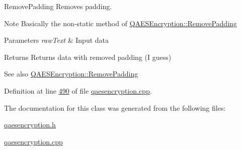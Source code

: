 Remove\+Padding Removes padding. 

\begin{DoxyNote}{Note}
Basically the non-\/static method of \hyperlink{class_q_a_e_s_encryption_abb2887bf5623a74053dd19627f3d3055}{Q\+A\+E\+S\+Encryption\+::\+Remove\+Padding}
\end{DoxyNote}

\begin{DoxyParams}{Parameters}
{\em raw\+Text} & Input data \\
\hline
\end{DoxyParams}
\begin{DoxyReturn}{Returns}
Returns data with removed padding (I guess) 
\end{DoxyReturn}
\begin{DoxySeeAlso}{See also}
\hyperlink{class_q_a_e_s_encryption_abb2887bf5623a74053dd19627f3d3055}{Q\+A\+E\+S\+Encryption\+::\+Remove\+Padding} 
\end{DoxySeeAlso}


Definition at line \hyperlink{qaesencryption_8cpp_source_l00490}{490} of file \hyperlink{qaesencryption_8cpp_source}{qaesencryption.\+cpp}.



The documentation for this class was generated from the following files\+:\begin{DoxyCompactItemize}
\item 
\hyperlink{qaesencryption_8h}{qaesencryption.\+h}\item 
\hyperlink{qaesencryption_8cpp}{qaesencryption.\+cpp}\end{DoxyCompactItemize}
